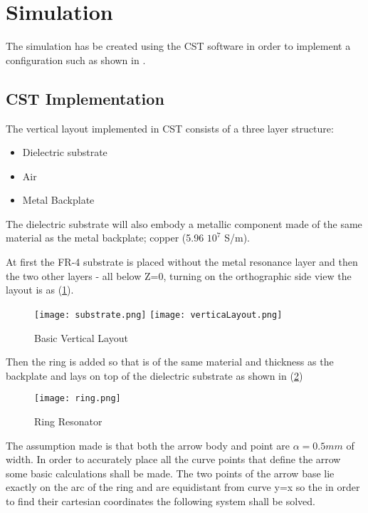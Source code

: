 \section{\textsf{Simulation}}
    The simulation has be created using the CST software in order to implement a configuration such as shown in \cite{zhang_design_2023}.

    \subsection{\textsf{CST Implementation}}
        The vertical layout implemented in CST consists of a three layer structure:
        \begin{itemize}
            \item Dielectric substrate
            \item Air
            \item Metal Backplate
        \end{itemize}

        The dielectric substrate will also embody a metallic component made of the same material as the metal backplate; copper
        (5.96 \mu $10^7$ S/m).

        At first the FR-4 substrate is placed without the metal resonance layer and then the two other layers - all below Z=0,
        turning on the orthographic side view the layout is as (\ref{img:layout}).
        \begin{figure}[h]
            \centering
            \texttt{[image: substrate.png]}\hfil
            \texttt{[image: verticaLayout.png]}
            \caption{Basic Vertical Layout}
            \label{img:layout}
        \end{figure}

        Then the ring is added so that is of the same material and thickness as the backplate and lays
        on top of the dielectric substrate as shown in (\ref{img:ring}) 
        \begin{figure}[h]
            \centering
            \texttt{[image: ring.png]}
            \caption{Ring Resonator}
            \label{img:ring}
        \end{figure}

        The assumption made is that both the arrow body and point are $\alpha=0.5mm$ of width.
        In order to accurately place all the curve points that define the arrow some basic calculations
        shall be made. The two points of the arrow base lie exactly on the arc of the ring and are 
        equidistant from curve y=x so the in order to find their cartesian coordinates the following
        system shall be solved. 

